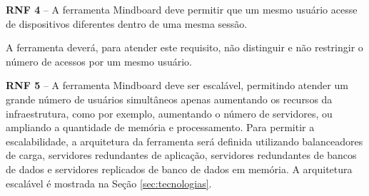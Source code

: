 \textbf{RNF 4} – A ferramenta Mindboard deve permitir que um mesmo usuário acesse de dispositivos diferentes dentro de uma mesma sessão. 

A ferramenta deverá, para atender este requisito, não distinguir e não restringir o número de acessos por um mesmo usuário.

\textbf{RNF 5} – A ferramenta Mindboard deve ser escalável, permitindo atender um grande número de usuários simultâneos apenas aumentando os recursos da infraestrutura, como por exemplo, aumentando o número de servidores, ou ampliando a quantidade de memória e processamento.  Para permitir a escalabilidade, a arquitetura da ferramenta será definida utilizando balanceadores de carga, servidores redundantes de aplicação, servidores redundantes de bancos de dados e servidores replicados de banco de dados em memória. A arquitetura escalável é mostrada na Seção \ref{sec:tecnologias}.